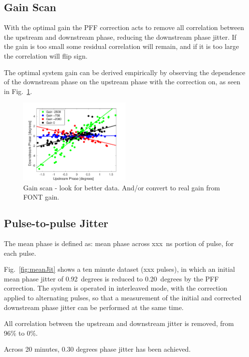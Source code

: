\documentclass[%
 reprint,
 amsmath,amssymb,
 aps,
]{revtex4-1}
\begin{document}
\subsection{\label{ss:gScan}Gain Scan}

With the optimal gain the PFF correction acts to remove all correlation between 
the upstream and downstream phase, reducing the downstream phase jitter. If the 
gain is too small some residual correlation will remain, and if it is too large 
the correlation will flip sign. 

The optimal system gain can be derived empirically by observing the dependence 
of the downstream phase on the upstream phase with the correction on, as seen 
in Fig.~\ref{fig:gScan}.

\begin{figure}
\includegraphics[width=0.5\textwidth]{figs/gScan}%
\caption{\label{fig:gScan}Gain scan - look for better data. And/or convert to 
real gain from FONT gain.}
\end{figure}


\subsection{\label{ss:meanJit}Pulse-to-pulse Jitter}

The mean phase is defined as: mean phase across xxx~ns portion of pulse, for 
each pulse.

Fig.~\ref{fig:meanJit} shows a ten minute dataset (xxx pulses), in which an 
initial mean phase jitter of 0.92~degrees is reduced to 0.20~degrees by the PFF 
correction. The system is operated in interleaved mode, with the correction 
applied to alternating pulses, so that a measurement of the initial and 
corrected downstream phase jitter can be performed at the same time.

All correlation between the upstream and downstream jitter is removed, from 
96\% to 0\%. 

Across 20 minutes, 0.30 degrees phase jitter has been achieved.
\end{document}
